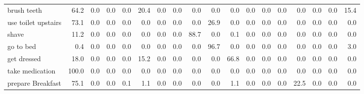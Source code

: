 \documentclass{article}
\begin{document}
\begin{sideways}
\begin{tabular}{lrrrrrrrrrrrrrrrrr}
brush teeth           &        64.2 &                0.0 &           0.0 &                          0.0 &               20.4 &                0.0 &                        0.0 &          0.0 &              0.0 &                0.0 &                    0.0 &                      0.0 &                  0.0 &                   0.0 &              0.0 &              0.0 &         15.4 \\
use toilet upstairs   &        73.1 &                0.0 &           0.0 &                          0.0 &                0.0 &                0.0 &                        0.0 &          0.0 &             26.9 &                0.0 &                    0.0 &                      0.0 &                  0.0 &                   0.0 &              0.0 &              0.0 &          0.0 \\
shave                 &        11.2 &                0.0 &           0.0 &                          0.0 &                0.0 &                0.0 &                        0.0 &         88.7 &              0.0 &                0.1 &                    0.0 &                      0.0 &                  0.0 &                   0.0 &              0.0 &              0.0 &          0.0 \\
go to bed             &         0.4 &                0.0 &           0.0 &                          0.0 &                0.0 &                0.0 &                        0.0 &          0.0 &             96.7 &                0.0 &                    0.0 &                      0.0 &                  0.0 &                   0.0 &              0.0 &              0.0 &          3.0 \\
get dressed           &        18.0 &                0.0 &           0.0 &                          0.0 &               15.2 &                0.0 &                        0.0 &          0.0 &              0.0 &               66.8 &                    0.0 &                      0.0 &                  0.0 &                   0.0 &              0.0 &              0.0 &          0.0 \\
take medication       &       100.0 &                0.0 &           0.0 &                          0.0 &                0.0 &                0.0 &                        0.0 &          0.0 &              0.0 &                0.0 &                    0.0 &                      0.0 &                  0.0 &                   0.0 &              0.0 &              0.0 &          0.0 \\
prepare Breakfast     &        75.1 &                0.0 &           0.0 &                          0.1 &                1.1 &                0.0 &                        0.0 &          0.0 &              0.0 &                1.1 &                    0.0 &                      0.0 &                  0.0 &                  22.5 &              0.0 &              0.0 &          0.0 \\

\end{tabular}
\end{sideways}
\end{document}
